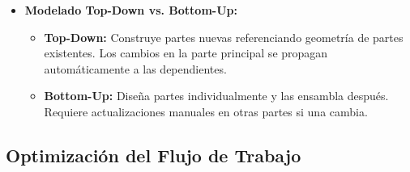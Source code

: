 \documentclass[12pt]{article}
\begin{document}
\begin{itemize}[label=\textbullet]
\begin{itemize}[label=\textendash]
    \end{itemize}
    \item \textbf{Modelado Top-Down vs. Bottom-Up:}
    \begin{itemize}[label=\textendash]
        \item \textbf{Top-Down:} Construye partes nuevas referenciando geometría de partes existentes. Los cambios en la parte principal se propagan automáticamente a las dependientes.
        \item \textbf{Bottom-Up:} Diseña partes individualmente y las ensambla después. Requiere actualizaciones manuales en otras partes si una cambia.
    \end{itemize}
\end{itemize}

\subsection{Optimización del Flujo de Trabajo}
\end{document}
